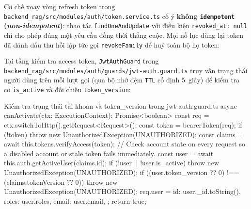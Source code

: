 Cơ chế xoay vòng refresh token trong \texttt{backend\_\allowbreak{}rag/\allowbreak{}src/\allowbreak{}modules/\allowbreak{}auth/\allowbreak{}token.\allowbreak{}service.\allowbreak{}ts} cố ý \textbf{không \texttt{idempotent} (\textit{non-idempotent})}: thao tác \texttt{findOneAndUpdate} với điều kiện \texttt{revoked\_\allowbreak{}at:\allowbreak{} null} chỉ cho phép đúng một yêu cầu đồng thời thắng cuộc. Mọi nỗ lực dùng lại token đã đánh dấu thu hồi lập tức gọi \texttt{revokeFamily} để huỷ toàn bộ họ token:


Tại tầng kiểm tra access token, \texttt{JwtAuthGuard} trong \texttt{backend\_\allowbreak{}rag/\allowbreak{}src/\allowbreak{}modules/\allowbreak{}auth/\allowbreak{}guards/\allowbreak{}jwt-\allowbreak{}auth.\allowbreak{}guard.\allowbreak{}ts} truy vấn trạng thái người dùng trên mỗi lượt gọi (qua bộ nhớ đệm \texttt{TTL} cố định 5~giây) để kiểm tra cờ \texttt{is\_active} và đối chiếu \texttt{token\_version}:

\begin{tsbox}{Kiểm tra trạng thái tài khoản và token\_version trong jwt-auth.guard.ts}
async canActivate(ctx: ExecutionContext): Promise<boolean> {
  const req = ctx.switchToHttp().getRequest<Request>();
  const token = bearerToken(req);
  if (!token) throw new UnauthorizedException(UNAUTHORIZED);
  const claims = await this.tokens.verifyAccess(token);
  // Check account state on every request so a disabled account or stale token fails immediately.
  const user = await this.auth.getActiveUser(claims.id);
  if (!user || !user.is_active) throw new UnauthorizedException(UNAUTHORIZED);
  if ((user.token_version ?? 0) !== (claims.tokenVersion ?? 0)) {
    throw new UnauthorizedException(UNAUTHORIZED);
  }
  req.user = {
    id: user._id.toString(),
    roles: user.roles,
    email: user.email,
  };
  return true;
}
\end{tsbox}

